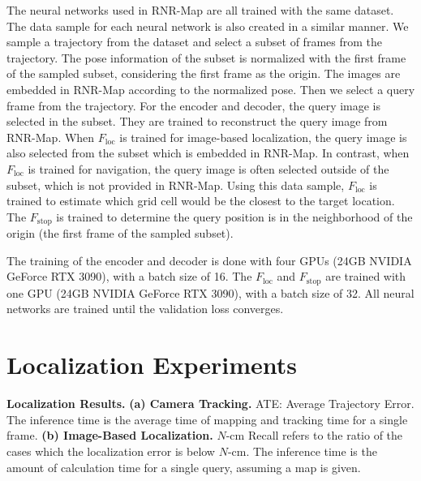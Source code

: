 \documentclass[10pt,twocolumn,letterpaper]{article}
\begin{document}
%
The neural networks used in RNR-Map are all trained with the same dataset.
%
The data sample for each neural network is also created in a similar manner.
%
We sample a trajectory from the dataset and select a subset of frames from the trajectory.
%
The pose information of the subset is normalized with the first frame of the sampled subset, considering the first frame as the origin.
%
The images are embedded in RNR-Map according to the normalized pose.
%
Then we select a query frame from the trajectory.
%
%
For the encoder and decoder, the query image is selected in the subset.
%
They are trained to reconstruct the query image from RNR-Map.
%
%
When $F_\mathrm{loc}$ is trained for image-based localization, the query image is also selected from the subset which is embedded in RNR-Map.
%
In contrast, when $F_\mathrm{loc}$ is trained for navigation, the query image is often selected outside of the subset, which is not provided in RNR-Map.
%
Using this data sample, $F_\mathrm{loc}$ is trained to estimate which grid cell would be the closest to the target location.
%
The $F_\mathrm{stop}$ is trained to determine the query position is in the neighborhood of the origin (the first frame of the sampled subset).

The training of the encoder and decoder is done with four GPUs (24GB NVIDIA GeForce RTX 3090), with a batch size of 16. 
The $F_\mathrm{loc}$ and $F_\mathrm{stop}$ are trained with one GPU (24GB NVIDIA GeForce RTX 3090), with a batch size of 32.
All neural networks are trained until the validation loss converges.


\section{Localization Experiments}\label{appendix:exp_loc}

\begin{table*}[h]
\centering
\resizebox{0.9\linewidth}{!}{
}
\caption{\textbf{Localization Results.} \textbf{(a) Camera Tracking.} ATE: Average Trajectory Error. The inference time is the average time of mapping and tracking time for a single frame. \textbf{(b) Image-Based Localization.} $N$-cm Recall refers to the ratio of the cases which the localization error is below $N$-cm. The inference time is the amount of calculation time for a single query, assuming a map is given.}
\label{table:basic_loc}
\end{table*}
\end{document}
